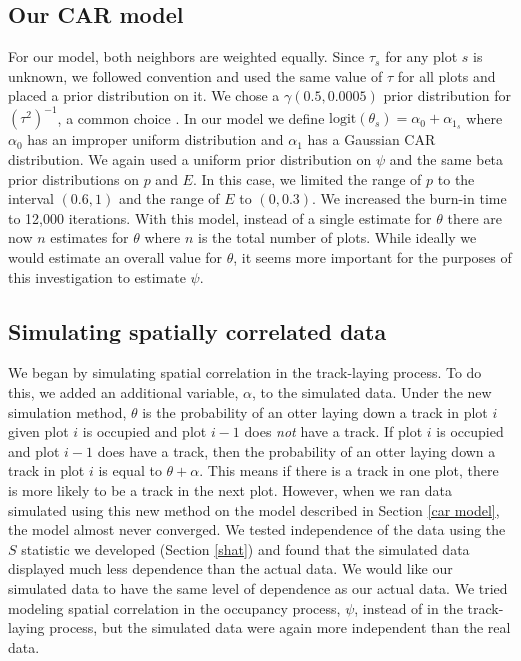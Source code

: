 \documentclass[12pt]{article}
\begin{document}
    \subsection{Our CAR model}
    \label{car model}
    For our model, both neighbors are weighted equally. Since $\tau_s$ for any
    plot $s$ is unknown, we followed convention and used the same value of
    $\tau$ for all plots and placed a prior distribution on it. We chose a
    $\gamma(0.5,0.0005)$ prior distribution for $(\tau^2)^{-1}$, a common choice
    \cite{Thomas2004}. In our model we define $\text{logit}(\theta_s)=\alpha_0+
    \alpha_{1_s}$ where $\alpha_0$ has an improper uniform distribution and
    $\alpha_1$ has a Gaussian CAR distribution. We again used a uniform prior
    distribution on $\psi$ and the same beta prior distributions on $p$ and $E$.
    In this case, we limited the range of $p$ to the interval $(0.6,1)$ and the
    range of $E$ to $(0,0.3)$. We increased the burn-in time to 12,000
    iterations. With this model, instead of a single estimate for $\theta$ there
    are now $n$ estimates for $\theta$ where $n$ is the total number of plots.
    While ideally we would estimate an overall value for $\theta$, it seems more
    important for the purposes of this investigation to estimate $\psi$.

    \subsection{Simulating spatially correlated data}
    \label{spatial simulation}
    We began by simulating
    spatial correlation in the track-laying process. To do this, we added an
    additional variable, $\alpha$, to the simulated data. Under the new
    simulation method, $\theta$ is the probability of an otter laying down a
    track in plot $i$ given plot $i$ is occupied and plot $i-1$ does
    \textit{not} have a track. If plot $i$ is occupied and plot $i-1$ does have
    a track, then the probability of an otter laying down a track in plot $i$ is
    equal to $\theta+\alpha$. This means if there is a track in one plot, there
    is more likely to be a track in the next plot. However, when we ran data
    simulated using this new method on the model described in Section \ref{car
    model}, the model almost never converged. We tested independence of the data
    using the $S$ statistic we developed (Section \ref{shat}) and found
    that the simulated data displayed much less dependence than the actual
    data. We would like our simulated data to have the same level of dependence
    as our actual data.  We tried modeling spatial correlation in the occupancy
    process, $\psi$, instead of in the track-laying process, but the simulated
    data were again more independent than the real data.
\end{document}
